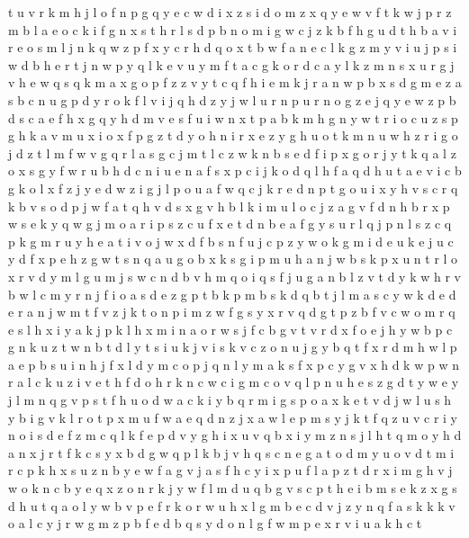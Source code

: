 \documentclass{article}
\begin{document}
t u v r k m h j l o f n p g q y e c w d i x z s
i d o m z x q y e w v f
t k w j
p r z m b l a e o c k i f g n x s
t h r l s d p b n o m i g w c
j z k b f h
g u d t h b a v i r e o s m l j n k q w z p f x y c
r h d q o x t b w f a n e c l k g z m y v i u j p s
i w
d b h e r t j n w p y q l k
e v u y m f t a c g k o r
d c a y l k z m n s x u r g j v h e w q
s q k m a x g o p f z
z v y t c q f h i e m k j r a n w p b x s d g
m e z a s b c n u g p d y r o k f l v i j
q h
d z y j w l u r n p
u r n o g z e
j q y e
w z p b d s c a e f h x
g q y h d m v e s f u i w n x t p a
b k m h g n y w t r i o c u
z s p g h k a v m u x i o
x f p g z t d y o h n
i r x e z y g h u o t k
m n u w h z r i g o j
d z t l m f w v g q r
l a s g c j m
t l c z w k n b s e d f i p x g o r j y
t k q a l z o x s g y f w r u b h d c n i
u e n a f s x p c i j k o d q l h
f a
q d h u t a e v i c b g k o l x f z j y
e d w z i g j l p o u
a f w q c j k r e d n p t g o u i x y h v s
c r q k b v s o d p j w f a
t q h v d s x
g v h b l k
i m u l o c j z a g v f d n h b r x p w s e k
y q w g j m o a r i p s z c u f x e t d n b
e a f g y s u r l q j p
n l s z c q p k g m r u y h e a t i v o j w x d f
b s n f u j c p z y w o k g m i d e
u k e
j u c y d f x p e h z g w t s n q a
u g
o b x k s g i p m u h a n
j w b s k p x u n t r
l o x r v d y m
l g u m
j s
w c n d b v h m q
o i q s f j u g a n b l z v t d y k w h r
v b w l c m y r n j f i o a s d e z g p t
b k p
m b s k d q
b t j l m a s c y w k d e
d e r a n j w m t f v z
j k t o n p i m z w f g s y x r v q
d g t p z b f v c w o m r q e s l h x i y a k j
p k l h x m i n a o r w s j f c b g v
t
v r d x f o e j h y w b p c g n k u z t
w n b t d l y
t s i u k j v
i s k v c z o n u j g y b q t f x r d m h w l p a e
p b s
u i n h j f x l d y m c o p
j q n l y m a k s f x p
c y g v x h d k w
p w n r a l c k u z i v e t h f
d o h r k n c
w c i g
m
c o v q l p n u h e s z g d t y w
e y j l m n q g v p s t f h u o d w a c k i
y b q r m i g s p o a x k e t v d j w l u
s h y b i g v k l r o t p x m u f w a e q d n z j
x a w l e p m s y j k t f q z u v c r i
y n o i s d e f
z m c q l k f e p d v y g h i x u
v q b x i y m z n s j l h t
q m o y h d a n x j
r t f k c s y x b d g w q
p l k b j v h q s c n e g a t o d m y u
o v d t m i r c p k h x s u z n b y e w f a g
v j a s f h c y i x p
u f l a p z t d r x i m g h v j w o k n c b y e q
x z o n r k j y w f l m d u q b g v s c p t h e
i
b m s e k
z x g s d h u t q a o l y w b v p e f r k
o r w u h x l g m b e c d v j z y n q f a s k
k
k v o a l c y j r w g m z p b f e d
b q s y d o n l g f w m p e x r v i u a k h c t
\end{document}
